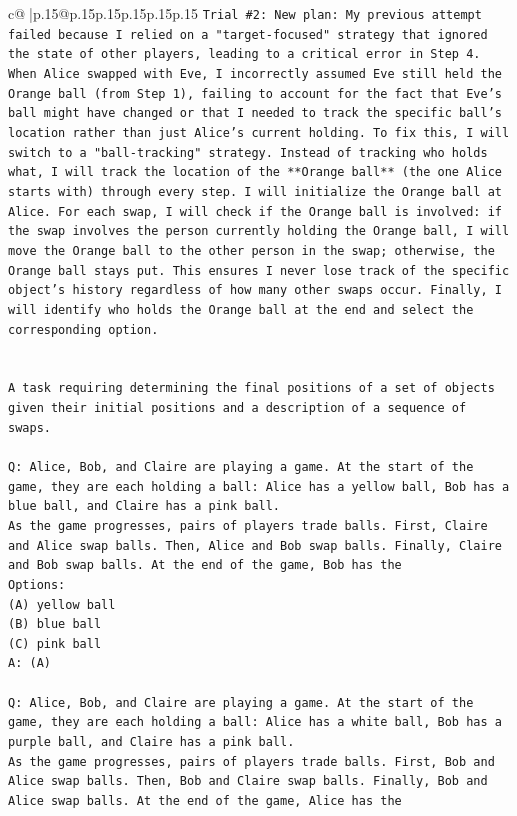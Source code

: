 \documentclass{article}
\begin{document}
{\begin{supertabular}{c@{$\;$}|p{.15\linewidth}@{}p{.15\linewidth}p{.15\linewidth}p{.15\linewidth}p{.15\linewidth}p{.15\linewidth}}
{{{\texttt{Trial \#2: New plan: My previous attempt failed because I relied on a "target{-}focused" strategy that ignored the state of other players, leading to a critical error in Step 4. When Alice swapped with Eve, I incorrectly assumed Eve still held the Orange ball (from Step 1), failing to account for the fact that Eve's ball might have changed or that I needed to track the specific ball's location rather than just Alice's current holding. To fix this, I will switch to a "ball{-}tracking" strategy. Instead of tracking who holds what, I will track the location of the **Orange ball** (the one Alice starts with) through every step. I will initialize the Orange ball at Alice. For each swap, I will check if the Orange ball is involved: if the swap involves the person currently holding the Orange ball, I will move the Orange ball to the other person in the swap; otherwise, the Orange ball stays put. This ensures I never lose track of the specific object's history regardless of how many other swaps occur. Finally, I will identify who holds the Orange ball at the end and select the corresponding option.} \\
\\ 
\\ 
\texttt{A task requiring determining the final positions of a set of objects given their initial positions and a description of a sequence of swaps.} \\
\\ 
\texttt{Q: Alice, Bob, and Claire are playing a game. At the start of the game, they are each holding a ball: Alice has a yellow ball, Bob has a blue ball, and Claire has a pink ball.} \\
\texttt{As the game progresses, pairs of players trade balls. First, Claire and Alice swap balls. Then, Alice and Bob swap balls. Finally, Claire and Bob swap balls. At the end of the game, Bob has the} \\
\texttt{Options:} \\
\texttt{(A) yellow ball} \\
\texttt{(B) blue ball} \\
\texttt{(C) pink ball} \\
\texttt{A: (A)} \\
\\ 
\texttt{Q: Alice, Bob, and Claire are playing a game. At the start of the game, they are each holding a ball: Alice has a white ball, Bob has a purple ball, and Claire has a pink ball.} \\
\texttt{As the game progresses, pairs of players trade balls. First, Bob and Alice swap balls. Then, Bob and Claire swap balls. Finally, Bob and Alice swap balls. At the end of the game, Alice has the} \\
}}}
\end{supertabular}}
\end{document}
